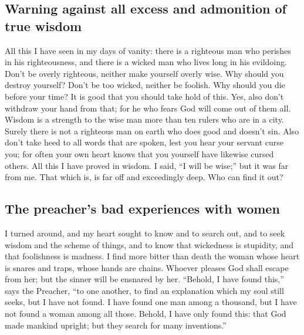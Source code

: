 \hypertarget{warning-against-all-excess-and-admonition-of-true-wisdom}{%
\subsection{Warning against all excess and admonition of true
wisdom}\label{warning-against-all-excess-and-admonition-of-true-wisdom}}

 All this I have seen in my days of vanity: there is a
righteous man who perishes in his righteousness, and there is a wicked
man who lives long in his evildoing.  Don't be overly
righteous, neither make yourself overly wise. Why should you destroy
yourself?  Don't be too wicked, neither be foolish. Why
should you die before your time?  It is good that you
should take hold of this. Yes, also don't withdraw your hand from that;
for he who fears God will come out of them all.  Wisdom
is a strength to the wise man more than ten rulers who are in a city.
 Surely there is not a righteous man on earth who does
good and doesn't sin.  Also don't take heed to all words
that are spoken, lest you hear your servant curse you; 
for often your own heart knows that you yourself have likewise cursed
others.  All this I have proved in wisdom. I said, ``I
will be wise;'' but it was far from me.  That which is,
is far off and exceedingly deep. Who can find it out?

\hypertarget{the-preachers-bad-experiences-with-women}{%
\subsection{The preacher's bad experiences with
women}\label{the-preachers-bad-experiences-with-women}}

 I turned around, and my heart sought to know and to
search out, and to seek wisdom and the scheme of things, and to know
that wickedness is stupidity, and that foolishness is madness.
 I find more bitter than death the woman whose heart is
snares and traps, whose hands are chains. Whoever pleases God shall
escape from her; but the sinner will be ensnared by her. 
``Behold, I have found this,'' says the Preacher, ``to one another, to
find an explanation  which my soul still seeks, but I
have not found. I have found one man among a thousand, but I have not
found a woman among all those.  Behold, I have only found
this: that God made mankind upright; but they search for many
inventions.''

